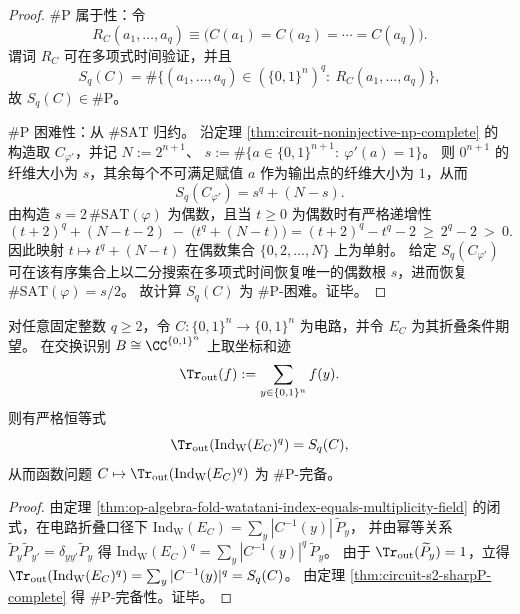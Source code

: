 \begin{proof}
\(\#\mathrm{P}\) 属于性：令
\[
R_C(a_1,\dots,a_q)\equiv\bigl(C(a_1)=C(a_2)=\cdots=C(a_q)\bigr).
\]
谓词 \(R_C\) 可在多项式时间验证，并且
\[
S_q(C)=\#\bigl\{(a_1,\dots,a_q)\in(\{0,1\}^n)^q:\ R_C(a_1,\dots,a_q)\bigr\},
\]
故 \(S_q(C)\in\#\mathrm{P}\)。
\par
\(\#\mathrm{P}\) 困难性：从 \(\#\mathrm{SAT}\) 归约。
沿定理 \ref{thm:circuit-noninjective-np-complete} 的构造取 \(C_{\varphi'}\)，并记 \(N:=2^{n+1}\)、
\(
s:=\#\{a\in\{0,1\}^{n+1}:\ \varphi'(a)=1\}
\)。
则 \(0^{n+1}\) 的纤维大小为 \(s\)，其余每个不可满足赋值 \(a\) 作为输出点的纤维大小为 \(1\)，从而
\[
S_q(C_{\varphi'})=s^q+(N-s).
\]
由构造 \(s=2\,\#\mathrm{SAT}(\varphi)\) 为偶数，且当 \(t\ge 0\) 为偶数时有严格递增性
\[
(t+2)^q+(N-t-2)\;-\;\bigl(t^q+(N-t)\bigr)=(t+2)^q-t^q-2\ \ge\ 2^q-2\ >\ 0.
\]
因此映射 \(t\mapsto t^q+(N-t)\) 在偶数集合 \(\{0,2,\dots,N\}\) 上为单射。
给定 \(S_q(C_{\varphi'})\) 可在该有序集合上以二分搜索在多项式时间恢复唯一的偶数根 \(s\)，进而恢复 \(\#\mathrm{SAT}(\varphi)=s/2\)。
故计算 \(S_q(C)\) 为 \(\#\mathrm{P}\)-困难。证毕。
\end{proof}

\begin{corollary}\label{cor:circuit-watatani-moments-sharpP-complete}
对任意固定整数 \(q\ge 2\)，令 \(C:\{0,1\}^n\to\{0,1\}^n\) 为电路，并令 \(E_C\) 为其折叠条件期望。
在交换识别 \(B\cong \CC^{\{0,1\}^n}\) 上取坐标和迹
\[
\Tr_{\mathrm{out}}(f):=\sum_{y\in\{0,1\}^n} f(y).
\]
则有严格恒等式
\[
\Tr_{\mathrm{out}}\!\left(\mathrm{Ind}_{\mathrm W}(E_C)^q\right)=S_q(C),
\]
从而函数问题 \(C\mapsto \Tr_{\mathrm{out}}(\mathrm{Ind}_{\mathrm W}(E_C)^q)\) 为 \(\#\mathrm{P}\)-完备。
\end{corollary}
\begin{proof}
由定理 \ref{thm:op-algebra-fold-watatani-index-equals-multiplicity-field} 的闭式，在电路折叠口径下
\(
\mathrm{Ind}_{\mathrm W}(E_C)=\sum_{y} |C^{-1}(y)|\,\widetilde P_y
\)，
并由幂等关系 \(\widetilde P_y\widetilde P_{y'}=\delta_{yy'}\widetilde P_y\) 得
\(
\mathrm{Ind}_{\mathrm W}(E_C)^q=\sum_y |C^{-1}(y)|^q\,\widetilde P_y
\)。
由于 \(\Tr_{\mathrm{out}}(\widetilde P_y)=1\)，立得
\(
\Tr_{\mathrm{out}}(\mathrm{Ind}_{\mathrm W}(E_C)^q)=\sum_y |C^{-1}(y)|^q=S_q(C)
\)。
由定理 \ref{thm:circuit-s2-sharpP-complete} 得 \(\#\mathrm{P}\)-完备性。证毕。
\end{proof}

